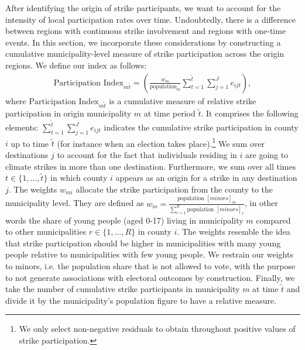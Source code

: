 After identifying the origin of strike participants, we want to account for the intensity of local participation rates over time. Undoubtedly, there is a difference between regions with continuous strike involvement and regions with one-time events. In this section, we incorporate these considerations by constructing a cumulative municipality-level measure of strike participation across the origin regions. We define our index as follows:
\begin{align}
	\text{Participation Index}_{m\tilde{t}} = \left( \frac{w_{m}}{\text{population}_{m}} \sum\limits_{t=1}^{\tilde{t}}\sum\limits_{j=1}^{J} e_{ijt}\right), \label{eq_greta_cons:participation_index}
\end{align}
where $\text{Participation Index}_{m\tilde{t}}$ is a cumulative measure of relative strike participation in origin municipality $m$ at time period $\tilde{t}$. It comprises the following elements: $\sum_{t=1}^{\tilde{t}}\sum_{j=1}^{J} e_{ijt}$ indicates the cumulative strike participation in county $i$ up to time $\tilde{t}$ (for instance when an election takes place).\footnote{We only select non-negative residuals to obtain throughout positive values of strike participation.} We sum over destinations $j$ to account for the fact that individuals residing in $i$ are going to climate strikes in more than one destination. Furthermore, we sum over all times $t\in\{1,...,\tilde{t}\}$ in which county $i$ appears as an origin for a strike in any destination $j$. The weights $w_{mi}$ allocate the strike participation from the county to the municipality level. They are defined as $w_m=\tfrac{\text{population }[minors]_m}{\sum_{r=1}^{R}\text{population }[minors]_r}$, in other words the share of young people (aged 0-17) living in municipality $m$ compared to other municipalities $r\in\{1,...,R\}$ in county $i$. The weights resemble the idea that strike participation should be higher in municipalities with many young people relative to municipalities with few young people. We restrain our weights to minors, i.e. the population share that is not allowed to vote, with the purpose to not generate associations with electoral outcomes by construction. Finally, we take the number of cumulative strike participants in municipality $m$ at time $\tilde{t}$ and divide it by the municipality's population figure to have a relative measure.

















